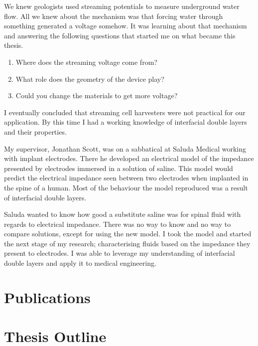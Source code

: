   We knew geologists used streaming potentials to measure underground water flow.
  All we knew about the mechanism was that forcing water through something generated a voltage somehow.
  It was learning about that mechanism and answering the following questions that started me on what became this thesis.
  \begin{enumerate}
    \item Where does the streaming voltage come from?
    \item What role does the geometry of the device play?
    \item Could you change the materials to get more voltage?
  \end{enumerate}
  I eventually concluded that streaming cell harvesters were not practical for our application.
  By this time I had a working knowledge of interfacial double layers and their properties.

  My supervisor, Jonathan Scott, was on a sabbatical at Saluda Medical working with implant electrodes.
  There he developed an electrical model of the impedance presented by electrodes immersed in a solution of saline.
  This model would predict the electrical impedance seen between two electrodes when implanted in the spine of a human.
  Most of the behaviour the model reproduced was a result of interfacial double layers.

  Saluda wanted to know how good a substitute saline was for spinal fluid with regards to electrical impedance.
  There was no way to know and no way to compare solutions, except for using the new model.
  I took the model and started the next stage of my research; characterising fluids based on the impedance they present to electrodes.
  I was able to leverage my understanding of interfacial double layers and apply it to medical engineering.

\section{Publications}

\section{Thesis Outline}
